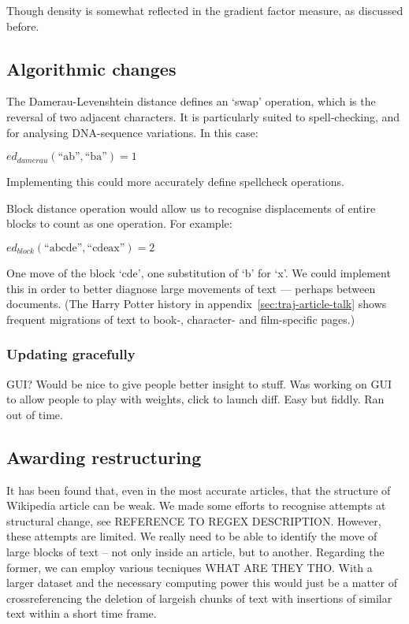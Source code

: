 Though density is somewhat reflected in the gradient factor measure,
as discussed before.

\subsection*{Algorithmic changes}
The Damerau-Levenshtein distance defines an `swap' operation, which is
the reversal of two adjacent characters. It is particularly suited to
spell-checking, and for analysing DNA-sequence variations. In this
case:

$ed_{damerau}(\text{``ab''},\text{``ba''}) = 1$

Implementing this could more accurately define spellcheck operations.

Block distance operation would allow us to recognise displacements of
entire blocks to count as one operation. For
example:

$ed_{block}(\text{``abcde''},\text{``cdeax''})= 2$

One move of the block `cde', one substitution of `b' for
`x'.\cite{Tichy1984} We could implement this in order to better
diagnose large movements of text --- perhaps between documents. (The
Harry Potter history in appendix~\ref{sec:traj-article-talk} shows
frequent migrations of text to book-, character- and film-specific
pages.)

\subsubsection*{Updating gracefully}
GUI? Would be nice to give people better insight to stuff. Was working
on GUI to allow people to play with weights, click to launch
diff. Easy but fiddly. Ran out of time.

\subsection*{Awarding restructuring}
\label{restructuring}
It has been found that, even in the most accurate articles, that the
structure of Wikipedia article can be weak.\cite{Giles2005} We made
some efforts to recognise attempts at structural change, see REFERENCE
TO REGEX DESCRIPTION. However, these attempts are limited. We really
need to be able to identify the move of large blocks of text -- not
only inside an article, but to another. Regarding the former, we can
employ various tecniques WHAT ARE THEY THO. With a larger dataset and the
necessary computing power this would just be a matter of
crossreferencing the deletion of largeish chunks of text with
insertions of similar text within a short time frame.

